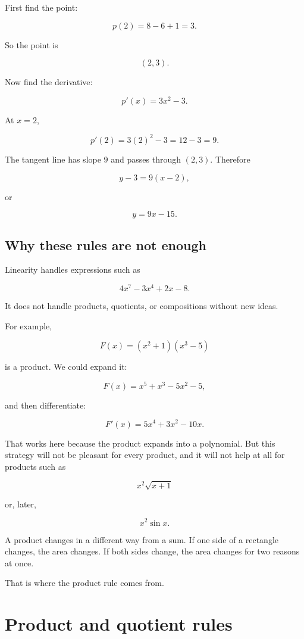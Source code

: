 First find the point:

\[
p(2)=8-6+1=3.
\]

So the point is

\[
(2,3).
\]

Now find the derivative:

\[
p'(x)=3x^2-3.
\]

At \(x=2\),

\[
p'(2)=3(2)^2-3=12-3=9.
\]

The tangent line has slope \(9\) and passes through \((2,3)\).  Therefore

\[
y-3=9(x-2),
\]

or

\[
\boxed{
y=9x-15.
}
\]

\subsection{Why these rules are not enough}
\label{subsec:linearity-not-enough}

Linearity handles expressions such as

\[
4x^7-3x^4+2x-8.
\]

It does not handle products, quotients, or compositions without new ideas.

For example,

\[
F(x)=(x^2+1)(x^3-5)
\]

is a product.  We could expand it:

\[
F(x)=x^5+x^3-5x^2-5,
\]

and then differentiate:

\[
F'(x)=5x^4+3x^2-10x.
\]

That works here because the product expands into a polynomial.  But this strategy will not be pleasant for every product, and it will not help at all for products such as

\[
x^2\sqrt{x+1}
\]

or, later,

\[
x^2\sin x.
\]

A product changes in a different way from a sum.  If one side of a rectangle changes, the area changes.  If both sides change, the area changes for two reasons at once.

That is where the product rule comes from.

\section{Product and quotient rules}
\label{sec:product-quotient-rules}

